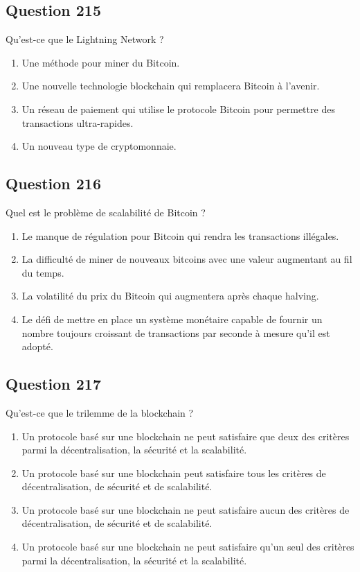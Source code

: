 \documentclass[12pt,a4paper]{article}
\begin{document}
\subsection*{Question 215}
Qu'est-ce que le Lightning Network ?

\begin{enumerate}[label=\Alph*., leftmargin=*]
\item Une méthode pour miner du Bitcoin.
\item Une nouvelle technologie blockchain qui remplacera Bitcoin à l'avenir.
\item Un réseau de paiement qui utilise le protocole Bitcoin pour permettre des transactions ultra-rapides.
\item Un nouveau type de cryptomonnaie.
\end{enumerate}

\bigskip


\subsection*{Question 216}
Quel est le problème de scalabilité de Bitcoin ?

\begin{enumerate}[label=\Alph*., leftmargin=*]
\item Le manque de régulation pour Bitcoin qui rendra les transactions illégales.
\item La difficulté de miner de nouveaux bitcoins avec une valeur augmentant au fil du temps.
\item La volatilité du prix du Bitcoin qui augmentera après chaque halving.
\item Le défi de mettre en place un système monétaire capable de fournir un nombre toujours croissant de transactions par seconde à mesure qu'il est adopté.
\end{enumerate}

\bigskip


\subsection*{Question 217}
Qu'est-ce que le trilemme de la blockchain ?

\begin{enumerate}[label=\Alph*., leftmargin=*]
\item Un protocole basé sur une blockchain ne peut satisfaire que deux des critères parmi la décentralisation, la sécurité et la scalabilité.
\item Un protocole basé sur une blockchain peut satisfaire tous les critères de décentralisation, de sécurité et de scalabilité.
\item Un protocole basé sur une blockchain ne peut satisfaire aucun des critères de décentralisation, de sécurité et de scalabilité.
\item Un protocole basé sur une blockchain ne peut satisfaire qu'un seul des critères parmi la décentralisation, la sécurité et la scalabilité.
\end{enumerate}
\end{document}

